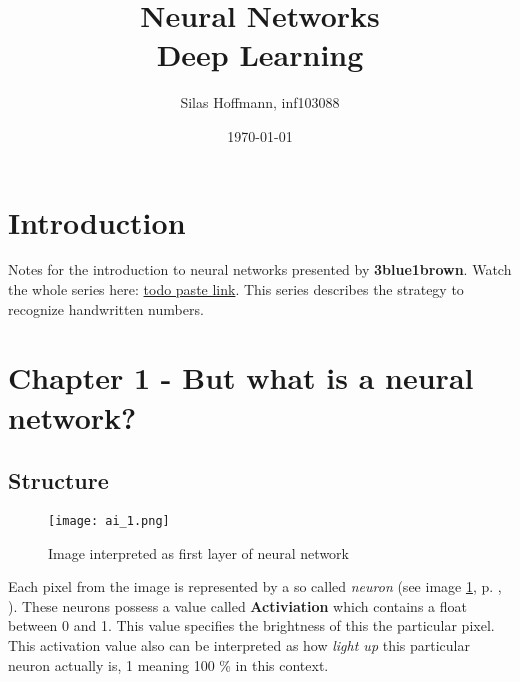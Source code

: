 \documentclass{article}
\title{%
Neural Networks \\
\large Deep Learning}
\author{Silas Hoffmann, inf103088}
\date{\today}
\newcommand{\lbl}[1]{(see image \ref{#1}, p. \pageref{#1}, \nameref{#1})}
\begin{document}
\maketitle

\vspace{0.5cm}
\tableofcontents
\vspace{0.5cm}

\section{Introduction}
Notes for the introduction to neural networks presented by \textbf{3blue1brown}. Watch the whole series here: \underline{todo paste link}. This series describes the strategy to recognize handwritten numbers.

\clearpage

\section{Chapter 1 - But what is a neural network?}


\subsection{Structure}

\FloatBarrier

\begin{figure}[h]
\centering
\texttt{[image: ai\_1.png]}
\caption{Image interpreted as first layer of neural network}
\label{ai_1}
\end{figure}

Each pixel from the image is represented by a so called \textit{neuron} \lbl{ai_1}. These neurons possess a value called \textbf{Activiation} which contains a float between 0 and 1. This value specifies the brightness of this the particular pixel. This activation value also can be interpreted as how \textit{light up} this particular neuron actually is, 1 meaning 100 \% in this context.
\end{document}
